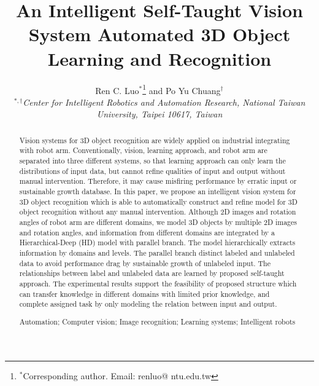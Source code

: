 \documentclass{tADR2e}
\begin{document}
   

\title{ An Intelligent Self-Taught Vision System Automated 3D Object Learning and Recognition}

\author{Ren C. Luo$^{\ast}$\thanks{$^{\ast}$Corresponding author. Email: renluo@
ntu.edu.tw
\vspace{6pt}} and Po Yu Chuang$^{\dagger}$
\\\vspace{6pt}  $^{\ast,\dagger}${\em{Center for Intelligent Robotics and Automation Research, National Taiwan University, Taipei 10617, Taiwan}}\\\vspace{6pt}}

\maketitle

\begin{abstract}
Vision systems for 3D object recognition are widely applied on industrial integrating with robot arm. Conventionally, vision, learning approach, and robot arm are separated into three different systems, so that learning approach can only learn the distributions of input data, but cannot refine qualities of input and output without manual intervention. Therefore, it may cause misfiring performance by erratic input or sustainable growth database. In this paper, we propose an intelligent vision system for 3D object recognition which is able to automatically construct and refine model for 3D object recognition without any manual intervention. Although 2D images and rotation angles of robot arm are different domains, we model 3D objects by multiple 2D images and rotation angles, and information from different domains are integrated by a Hierarchical-Deep (HD) model with parallel branch. The model hierarchically extracts information by domains and levels. The parallel branch distinct labeled and unlabeled data to avoid performance drag by sustainable growth of unlabeled input. The relationships between label and unlabeled data are learned by proposed self-taught approach. The experimental results support the feasibility of proposed structure which can transfer knowledge in different domains with limited prior knowledge, and complete assigned task by only modeling the relation between input and output.\medskip

\begin{keywords}Automation; Computer vision; Image recognition; Learning systems; Intelligent robots 
\end{keywords}\medskip

\end{abstract}
\end{document}
